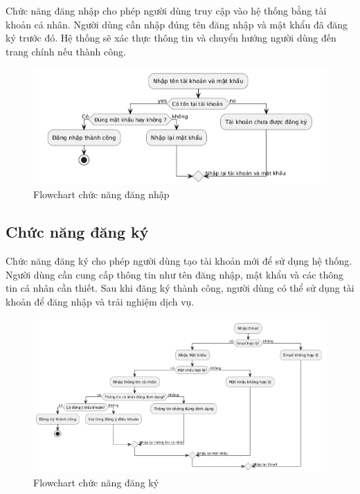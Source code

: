Chức năng đăng nhập cho phép người dùng truy cập vào hệ thống bằng tài khoản cá nhân. Người dùng cần nhập đúng tên đăng nhập và mật khẩu đã đăng ký trước đó. Hệ thống sẽ xác thực thông tin và chuyển hướng người dùng đến trang chính nếu thành công.

\begin{figure}
    \centering
    \includegraphics[width=1\linewidth]{images/flowchart-dang-nhap.png}
    \caption{Flowchart chức năng đăng nhập}
    \label{fig:flowchart-dang-nhap}
\end{figure}

\subsection{Chức năng đăng ký}
\label{subsec:dang-ky}

Chức năng đăng ký cho phép người dùng tạo tài khoản mới để sử dụng hệ thống. Người dùng cần cung cấp thông tin như tên đăng nhập, mật khẩu và các thông tin cá nhân cần thiết. Sau khi đăng ký thành công, người dùng có thể sử dụng tài khoản để đăng nhập và trải nghiệm dịch vụ.

\begin{figure}
    \centering
    \includegraphics[width=1\linewidth]{images/flowchart-dang-ky.png}
    \caption{Flowchart chức năng đăng ký}
    \label{fig:flowchart-dang-ky}
\end{figure}

